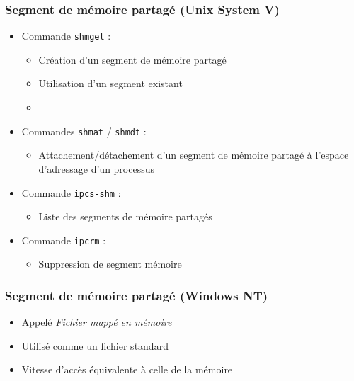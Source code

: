 \begin{frame}
\frametitle{Segment de mémoire partagé (Unix System V)}
\begin{itemize}
\item Commande \texttt{shmget} :
\begin{itemize}
\item Création d’un segment de mémoire partagé
\item Utilisation d’un segment existant
\item 
\end{itemize}
\item Commandes \texttt{shmat} / \texttt{shmdt} : 
\begin{itemize}
\item Attachement/détachement d’un segment de mémoire partagé à l'espace d'adressage d'un processus
\end{itemize}
\item Commande \texttt{ipcs-shm} :
\begin{itemize}
\item Liste des segments de mémoire partagés
\end{itemize}
\item Commande \texttt{ipcrm} :
\begin{itemize}
\item Suppression de segment mémoire
\end{itemize}
\end{itemize}
\end{frame}

\begin{frame}
\frametitle{Segment de mémoire partagé (Windows NT)}
\begin{itemize}
\item Appelé \textit{Fichier mappé en mémoire}
\item Utilisé comme un fichier standard
\item Vitesse d’accès équivalente à celle de la mémoire
\end{itemize}
\end{frame}


